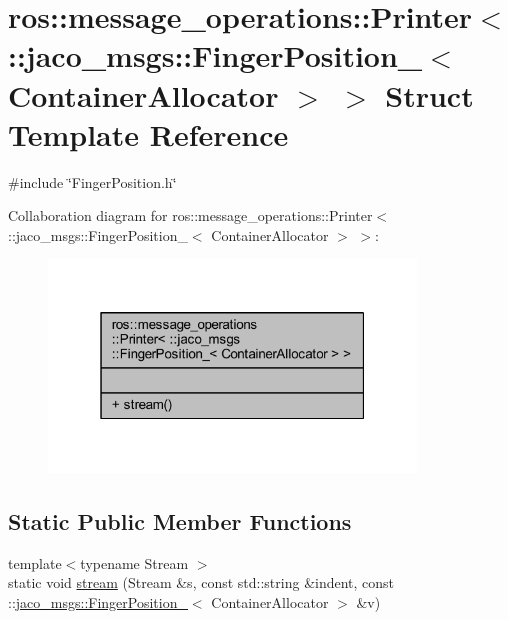 \hypertarget{structros_1_1message__operations_1_1Printer_3_01_1_1jaco__msgs_1_1FingerPosition___3_01ContainerAllocator_01_4_01_4}{}\section{ros\+:\+:message\+\_\+operations\+:\+:Printer$<$ \+:\+:jaco\+\_\+msgs\+:\+:Finger\+Position\+\_\+$<$ Container\+Allocator $>$ $>$ Struct Template Reference}
\label{structros_1_1message__operations_1_1Printer_3_01_1_1jaco__msgs_1_1FingerPosition___3_01ContainerAllocator_01_4_01_4}


{\ttfamily \#include \char`\"{}Finger\+Position.\+h\char`\"{}}



Collaboration diagram for ros\+:\+:message\+\_\+operations\+:\+:Printer$<$ \+:\+:jaco\+\_\+msgs\+:\+:Finger\+Position\+\_\+$<$ Container\+Allocator $>$ $>$\+:
\nopagebreak
\begin{figure}[H]
\begin{center}
\leavevmode
\includegraphics[width=277pt]{d6/dc0/structros_1_1message__operations_1_1Printer_3_01_1_1jaco__msgs_1_1FingerPosition___3_01Container56ec8e7c56008f1ed5b79c1889351f51}
\end{center}
\end{figure}
\subsection*{Static Public Member Functions}
\begin{DoxyCompactItemize}
\item 
{\footnotesize template$<$typename Stream $>$ }\\static void \hyperlink{structros_1_1message__operations_1_1Printer_3_01_1_1jaco__msgs_1_1FingerPosition___3_01ContainerAllocator_01_4_01_4_ab84f4e2bedb66dcd8daa7cc36c250624}{stream} (Stream \&s, const std\+::string \&indent, const \+::\hyperlink{structjaco__msgs_1_1FingerPosition__}{jaco\+\_\+msgs\+::\+Finger\+Position\+\_\+}$<$ Container\+Allocator $>$ \&v)
\end{DoxyCompactItemize}


